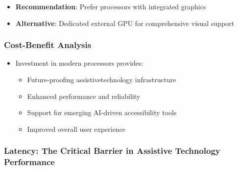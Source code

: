 \begin{itemize}
	\item \textbf{Recommendation}: Prefer processors with integrated graphics \supercite{IntelIntegratedGraphics}
	\item \textbf{Alternative}: Dedicated external GPU for comprehensive visual support \supercite{ExternalGPUAssistiveTech}
\end{itemize}


\subsubsection{Cost-Benefit Analysis}

\begin{itemize}
	\item Investment in modern processors provides:
	      \begin{itemize}
		      \item Future-proofing \gls{assistivetechnology} infrastructure \supercite{FutureProofingTech}
		      \item Enhanced performance and reliability \supercite{ModernProcessorBenefits}
		      \item Support for emerging AI-driven accessibility tools \supercite{AIinAccessibility}
		      \item Improved overall user experience \supercite{UserExperienceImprovements}
	      \end{itemize}
\end{itemize}


\subsubsection{Latency: The Critical Barrier in Assistive Technology Performance}


